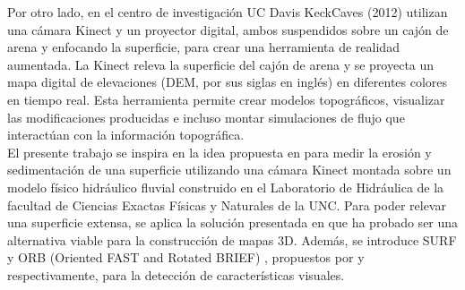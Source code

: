 Por otro lado, en el centro de investigación UC Davis KeckCaves (2012) \cite{arsandbox} utilizan una cámara Kinect y un proyector digital, ambos suspendidos sobre un cajón de arena y enfocando la superficie, para crear una herramienta de realidad aumentada. La Kinect releva la superficie del cajón de arena y se proyecta un mapa digital de elevaciones (DEM, por sus siglas en inglés) en diferentes colores en tiempo real. Esta herramienta permite crear modelos topográficos, visualizar las modificaciones producidas e incluso montar simulaciones de flujo que interactúan con la información topográfica. \\
El presente trabajo se inspira en la idea propuesta en \cite{arsandbox} para medir la erosión y sedimentación de una superficie utilizando una cámara Kinect montada sobre un modelo físico hidráulico fluvial construido en el Laboratorio de Hidráulica de la facultad de Ciencias Exactas Físicas y Naturales de la UNC. Para poder relevar una superficie extensa, se aplica la solución presentada en \cite{henry2010rgb} que ha probado ser una alternativa viable para la construcción de mapas 3D. Además, se introduce SURF y ORB (Oriented FAST and Rotated BRIEF) \cite{RubleeRKB11}, propuestos por \cite{engelhard2011real} y \cite{fioraio2011realtime} respectivamente, para la detección de características visuales.
